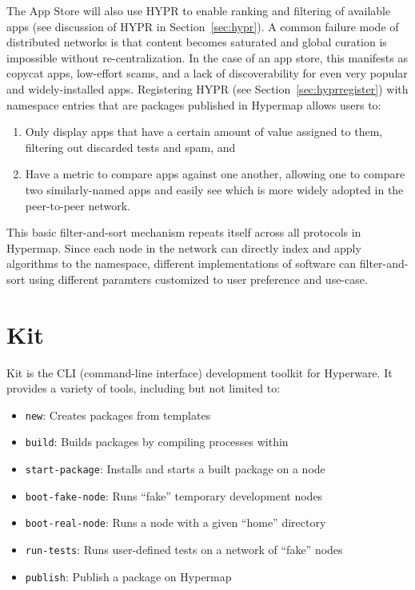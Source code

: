 \documentclass[runningheads]{llncs}
\begin{document}
The App Store will also use HYPR to enable ranking and filtering of available apps (see discussion of HYPR in Section~\ref{sec:hypr}).
A common failure mode of distributed networks is that content becomes saturated and global curation is impossible without re-centralization.
In the case of an app store, this manifests as copycat apps, low-effort scams, and a lack of discoverability for even very popular and widely-installed apps.
Registering HYPR (see Section~\ref{sec:hyprregister}) with namespace entries that are packages published in Hypermap allows users to:
\begin{enumerate}
	\item Only display apps that have a certain amount of value assigned to them, filtering out discarded tests and spam, and
	\item Have a metric to compare apps against one another, allowing one to compare two similarly-named apps and easily see which is more widely adopted in the peer-to-peer network.
\end{enumerate}
This basic filter-and-sort mechanism repeats itself across all protocols in Hypermap.
Since each node in the network can directly index and apply algorithms to the namespace, different implementations of software can filter-and-sort using different paramters customized to user preference and use-case.

\section{Kit}

Kit is the CLI (command-line interface) development toolkit for Hyperware.
It provides a variety of tools, including but not limited to:
\begin{itemize}
	\item \verb|new|: Creates packages from templates
	\item \verb|build|: Builds packages by compiling processes within
	\item \verb|start-package|: Installs and starts a built package on a node
	\item \verb|boot-fake-node|: Runs ``fake'' temporary development nodes
	\item \verb|boot-real-node|: Runs a node with a given ``home'' directory
	\item \verb|run-tests|: Runs user-defined tests on a network of ``fake'' nodes
	\item \verb|publish|: Publish a package on Hypermap
\end{itemize}
\end{document}
